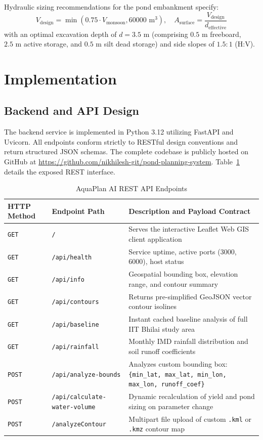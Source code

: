 \documentclass[manuscript,screen,review]{acmart}
\begin{document}
Hydraulic sizing recommendations for the pond embankment specify:
\begin{equation}
    V_{\text{design}} = \min(0.75 \cdot V_{\text{monsoon}}, 60000\text{ m}^3), \quad A_{\text{surface}} = \frac{V_{\text{design}}}{d_{\text{effective}}}
\end{equation}
with an optimal excavation depth of $d = 3.5\text{ m}$ (comprising $0.5\text{ m}$ freeboard, $2.5\text{ m}$ active storage, and $0.5\text{ m}$ silt dead storage) and side slopes of $1.5:1$ (H:V).

\section{Implementation}
\label{sec:implementation}

\subsection{Backend and API Design}
The backend service is implemented in Python 3.12 utilizing FastAPI and Uvicorn. All endpoints conform strictly to RESTful design conventions and return structured JSON schemas. The complete codebase is publicly hosted on GitHub at \url{https://github.com/nikhilesh-git/pond-planning-system}. Table~\ref{tab:api-endpoints} details the exposed REST interface.

\begin{table}[h]
  \caption{AquaPlan AI REST API Endpoints}
  \label{tab:api-endpoints}
  \begin{tabular}{p{2.6cm}p{4.2cm}p{6.5cm}}
    \toprule
    HTTP Method & Endpoint Path & Description and Payload Contract \\
    \midrule
    \texttt{GET} & \texttt{/} & Serves the interactive Leaflet Web GIS client application \\
    \texttt{GET} & \texttt{/api/health} & Service uptime, active ports (3000, 6000), host status \\
    \texttt{GET} & \texttt{/api/info} & Geospatial bounding box, elevation range, and contour summary \\
    \texttt{GET} & \texttt{/api/contours} & Returns pre-simplified GeoJSON vector contour isolines \\
    \texttt{GET} & \texttt{/api/baseline} & Instant cached baseline analysis of full IIT Bhilai study area \\
    \texttt{GET} & \texttt{/api/rainfall} & Monthly IMD rainfall distribution and soil runoff coefficients \\
    \texttt{POST} & \texttt{/api/analyze-bounds} & Analyzes custom bounding box: \texttt{\{min\_lat, max\_lat, min\_lon, max\_lon, runoff\_coef\}} \\
    \texttt{POST} & \texttt{/api/calculate-water-volume} & Dynamic recalculation of yield and pond sizing on parameter change \\
    \texttt{POST} & \texttt{/analyzeContour} & Multipart file upload of custom \texttt{.kml} or \texttt{.kmz} contour map \\
    \bottomrule
  \end{tabular}
\end{table}
\end{document}
